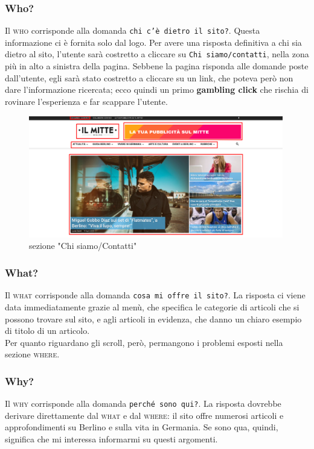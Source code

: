 \subsubsection{Who?}
Il \textsc{who} corrisponde alla domanda \texttt{chi c'è dietro il sito?}. Questa informazione ci è fornita solo dal logo. Per avere una risposta definitiva a chi sia dietro al sito, l'utente sarà costretto a cliccare su \texttt{Chi siamo/contatti}, nella zona più in alto a sinistra della pagina. Sebbene la pagina risponda alle domande poste dall'utente, egli sarà stato costretto a cliccare su un link, che poteva però non dare l'informazione ricercata; ecco quindi un primo \textbf{gambling click} che rischia di rovinare l'esperienza e far scappare l'utente.

\vspace{30pt}
\begin{figure}[htbp]
\begin{center}
\includegraphics[width=30em]{img/home1}
\caption{sezione "Chi siamo/Contatti"}
\end{center}
\end{figure}
\vspace{30pt}


\subsubsection{What?}
Il \textsc{what} corrisponde alla domanda \texttt{cosa mi offre il sito?}. La risposta ci viene data immediatamente grazie al menù, che specifica le categorie di articoli che si possono trovare sul sito, e agli articoli in evidenza, che danno un chiaro esempio di titolo di un articolo. \\
Per quanto riguardano gli scroll, però, permangono i problemi esposti nella sezione \textsc{where}.

\subsubsection{Why?}
Il \textsc{why} corrisponde alla domanda \texttt{perché sono qui?}. La risposta dovrebbe derivare direttamente dal \textsc{what} e dal \textsc{where}: il sito offre numerosi articoli e approfondimenti su Berlino e sulla vita in Germania. Se sono qua, quindi, significa che mi interessa informarmi su questi argomenti.

